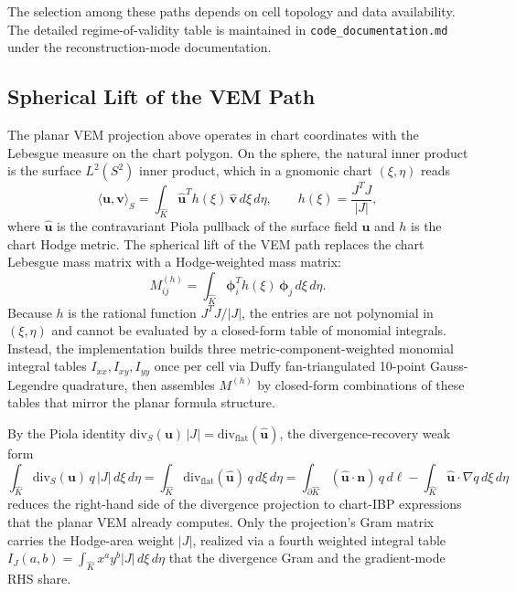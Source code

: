 \documentclass[11pt]{article}
\begin{document}
\noindent The selection among these paths depends on cell topology and data
availability.  The detailed regime-of-validity table is maintained in
\texttt{code\_documentation.md} under the reconstruction-mode documentation.

\subsection{Spherical Lift of the VEM Path}
\label{sec:spherical-vem-lift}

The planar VEM projection above operates in chart coordinates with the
Lebesgue measure on the chart polygon.  On the sphere, the natural inner
product is the surface \(L^2(S^2)\) inner product, which in a gnomonic chart
\((\xi,\eta)\) reads
\[
  \langle \mathbf{u}, \mathbf{v}\rangle_{S}
  = \int_{\hat K} \hat{\mathbf{u}}^T h(\xi)\,\hat{\mathbf{v}}\,d\xi\,d\eta,
  \qquad
  h(\xi) = \frac{J^T J}{|J|},
\]
where \(\hat{\mathbf{u}}\) is the contravariant Piola pullback of the surface
field \(\mathbf{u}\) and \(h\) is the chart Hodge metric.  The spherical lift
of the VEM path replaces the chart Lebesgue mass matrix with a
Hodge-weighted mass matrix:
\[
  M_{ij}^{(h)}
  = \int_{\hat K} \boldsymbol{\phi}_i^T h(\xi)\,\boldsymbol{\phi}_j\,d\xi\,d\eta.
\]
Because \(h\) is the rational function \(J^T J/|J|\), the entries are not
polynomial in \((\xi,\eta)\) and cannot be evaluated by a closed-form table
of monomial integrals.  Instead, the implementation builds three
metric-component-weighted monomial integral tables
\(I_{xx}, I_{xy}, I_{yy}\) once per cell via Duffy fan-triangulated 10-point
Gauss-Legendre quadrature, then assembles \(M^{(h)}\) by closed-form
combinations of these tables that mirror the planar formula structure.

By the Piola identity \(\mathrm{div}_S(\mathbf{u})\,|J| =
\mathrm{div}_{\mathrm{flat}}(\hat{\mathbf{u}})\), the divergence-recovery
weak form
\[
  \int_{\hat K} \mathrm{div}_S(\mathbf{u})\,q\,|J|\,d\xi\,d\eta
  = \int_{\hat K} \mathrm{div}_{\mathrm{flat}}(\hat{\mathbf{u}})\,q\,d\xi\,d\eta
  = \int_{\partial\hat K} (\hat{\mathbf{u}}\cdot\mathbf{n})\,q\,d\ell
    - \int_{\hat K} \hat{\mathbf{u}}\cdot\nabla q\,d\xi\,d\eta
\]
reduces the right-hand side of the divergence projection to chart-IBP
expressions that the planar VEM already computes.  Only the projection's
Gram matrix carries the Hodge-area weight \(|J|\), realized via a fourth
weighted integral table \(I_J(a,b)=\int_{\hat K} x^a y^b |J|\,d\xi\,d\eta\)
that the divergence Gram and the gradient-mode RHS share.
\end{document}
